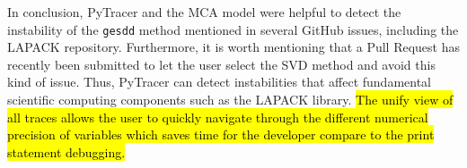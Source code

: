 \documentclass[10pt,journal,compsoc]{IEEEtran}
\newcommand{\pytracer}[0]{PyTracer\xspace}
\DeclareRobustCommand{\add}[1]{\sethlcolor{lightgreen}\hl{#1}}
\begin{document}
In conclusion, \pytracer and the MCA model were helpful to detect the
instability of the \texttt{gesdd} method mentioned in several GitHub issues,
including the LAPACK repository. Furthermore, it is worth mentioning that a Pull
Request has recently been submitted to let the user select the SVD method and
avoid this kind of issue. Thus, \pytracer can detect instabilities that affect
fundamental scientific computing components such as the LAPACK library. \add{The
    unify view of all traces allows the user to quickly navigate through the
    different numerical precision of variables which saves time for the developer
    compare to the print statement debugging.}
\end{document}
